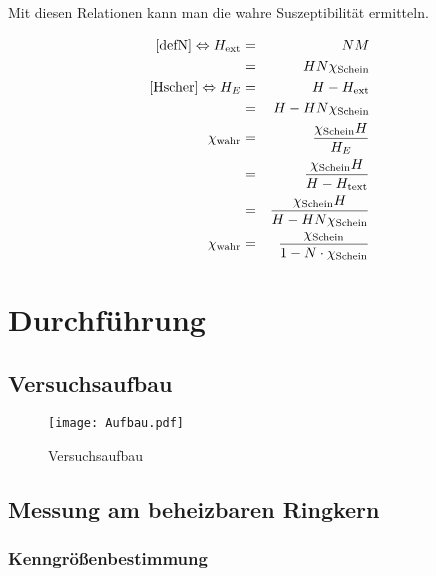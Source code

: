 \documentclass[12pt,a4paper]{scrartcl}
\numberwithin{equation}{section} %
\renewcommand{\[}{} %
\renewcommand{\]}{\noindent} %
\begin{document}
Mit diesen Relationen kann man die wahre Suszeptibilität ermitteln.

\[
\begin{eqnarray}
    \eqref{defN} \Leftrightarrow H_\mathrm{ext} &=& NM
        \nonumber \\
        &=& HN\chi_\mathrm{Schein}
        \nonumber \\
    \eqref{Hscher} \Leftrightarrow H_E &=& H - H_\mathrm{ext}
        \nonumber \\
        &=& H - HN\chi_\mathrm{Schein}
        \nonumber \\
    \chi_\mathrm{wahr}
        &=& \frac{\chi_\mathrm{Schein} H}{H_E}
        \nonumber \\
        &=& \frac{\chi_\mathrm{Schein} H}{H - H_\mathrm{text}}
        \nonumber \\
        &=& \frac{\chi_\mathrm{Schein} H}{H - HN\chi_\mathrm{Schein}}
        \nonumber \\
    \chi_\mathrm{wahr}
        &=& \frac{\chi_\mathrm{Schein}}{1 - N\cdot\chi_\mathrm{Schein}} \label{ChiWahr}
\end{eqnarray}
\]

\hypertarget{durchfuxfchrung}{%
\section{Durchführung}\label{durchfuxfchrung}}

\hypertarget{versuchsaufbau}{%
\subsection{Versuchsaufbau}\label{versuchsaufbau}}

\begin{figure}
\centering
\texttt{[image: Aufbau.pdf]}
\caption{Versuchsaufbau}
\end{figure}

\hypertarget{messung-am-beheizbaren-ringkern}{%
\subsection{Messung am beheizbaren
Ringkern}\label{messung-am-beheizbaren-ringkern}}

\hypertarget{kenngruxf6uxdfenbestimmung}{%
\subsubsection{Kenngrößenbestimmung}\label{kenngruxf6uxdfenbestimmung}}
\end{document}
